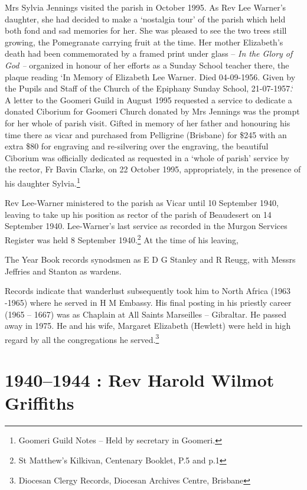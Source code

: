 Mrs Sylvia Jennings visited the parish in October 1995. As Rev Lee
Warner's daughter, she had decided to make a `nostalgia tour' of the
parish which held both fond and sad memories for her. She was pleased to
see the two trees still growing, the Pomegranate carrying fruit at the
time. Her mother Elizabeth's death had been commemorated by a framed
print under glass -- \emph{In the Glory of God --} organized in honour
of her efforts as a Sunday School teacher there, the plaque reading `In
Memory of Elizabeth Lee Warner. Died 04-09-1956. Given by the Pupils and
Staff of the Church of the Epiphany Sunday School, 21-07-1957.` A letter
to the Goomeri Guild in August 1995 requested a service to dedicate a
donated Ciborium for Goomeri Church donated by Mrs Jennings was the
prompt for her whole of parish visit. Gifted in memory of her father and
honouring his time there as vicar and purchased from Pelligrine
(Brisbane) for \$245 with an extra \$80 for engraving and re-silvering
over the engraving, the beautiful Ciborium was officially dedicated as
requested in a `whole of parish' service by the rector, Fr Bavin Clarke,
on 22 October 1995, appropriately, in the presence of his daughter
Sylvia.\footnote{Goomeri Guild Notes -- Held by secretary in Goomeri.}

Rev Lee-Warner ministered to the parish as Vicar until 10 September
1940, leaving to take up his position as rector of the parish of
Beaudesert on 14 September 1940. Lee-Warner's last service as recorded
in the Murgon Services Register was held 8 September 1940.\footnote{St
  Matthew's Kilkivan, Centenary Booklet, P.5 and p.1} At the time of his
leaving,

The Year Book records synodsmen as E D G Stanley and R Reugg, with
Messrs Jeffries and Stanton as wardens.

Records indicate that wanderlust subsequently took him to North Africa
(1963 -1965) where he served in H M Embassy. His final posting in his
priestly career (1965 -- 1667) was as Chaplain at All Saints Marseilles
-- Gibraltar. He passed away in 1975. He and his wife, Margaret
Elizabeth (Hewlett) were held in high regard by all the congregations he
served.\footnote{Diocesan Clergy Records, Diocesan Archives Centre,
  Brisbane}

\printendnotes[custom]
\setcounter{endnote}{0}
\chapter{1940--1944 : Rev Harold Wilmot
Griffiths}

